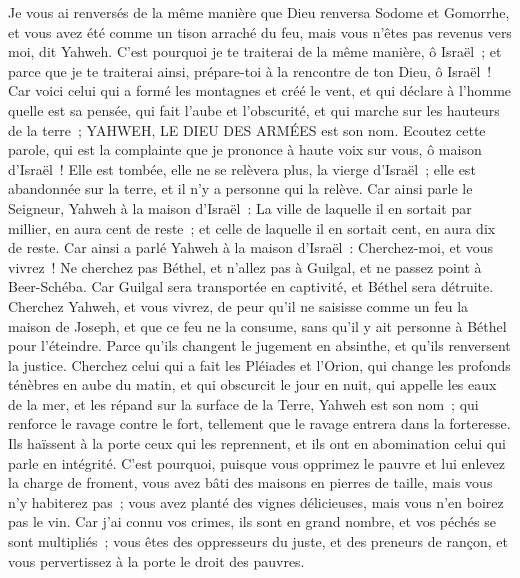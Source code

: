 \begin{multicols}{2}
Je vous ai renversés de la même manière que Dieu renversa Sodome et Gomorrhe, et vous avez été comme un tison arraché du feu, mais vous n'êtes pas revenus vers moi, dit Yahweh.
C'est pourquoi je te traiterai de la même manière, ô Israël~; et parce que je te traiterai ainsi, prépare-toi à la rencontre de ton Dieu, ô Israël~!
Car voici celui qui a formé les montagnes et créé le vent, et qui déclare à l'homme quelle est sa pensée, qui fait l'aube et l'obscurité, et qui marche sur les hauteurs de la terre~; YAHWEH, LE DIEU DES ARMÉES est son nom.
\VerseOne{}Ecoutez cette parole, qui est la complainte que je prononce à haute voix sur vous, ô maison d'Israël~!
Elle est tombée, elle ne se relèvera plus, la vierge d'Israël~; elle est abandonnée sur la terre, et il n'y a personne qui la relève.
Car ainsi parle le Seigneur, Yahweh à la maison d'Israël~: La ville de laquelle il en sortait par millier, en aura cent de reste~; et celle de laquelle il en sortait cent, en aura dix de reste.
Car ainsi a parlé Yahweh à la maison d'Israël~: Cherchez-moi, et vous vivrez~!
Ne cherchez pas Béthel, et n'allez pas à Guilgal, et ne passez point à Beer-Schéba. Car Guilgal sera transportée en captivité, et Béthel sera détruite.
Cherchez Yahweh, et vous vivrez, de peur qu'il ne saisisse comme un feu la maison de Joseph, et que ce feu ne la consume, sans qu'il y ait personne à Béthel pour l'éteindre.
Parce qu'ils changent le jugement en absinthe, et qu'ils renversent la justice.
Cherchez celui qui a fait les Pléiades et l'Orion, qui change les profonds ténèbres en aube du matin, et qui obscurcit le jour en nuit, qui appelle les eaux de la mer, et les répand sur la surface de la Terre, Yahweh est son nom~;
qui renforce le ravage contre le fort, tellement que le ravage entrera dans la forteresse.
Ils haïssent à la porte ceux qui les reprennent, et ils ont en abomination celui qui parle en intégrité.
C'est pourquoi, puisque vous opprimez le pauvre et lui enlevez la charge de froment, vous avez bâti des maisons en pierres de taille, mais vous n'y habiterez pas~; vous avez planté des vignes délicieuses, mais vous n'en boirez pas le vin.
Car j'ai connu vos crimes, ils sont en grand nombre, et vos péchés se sont multipliés~; vous êtes des oppresseurs du juste, et des preneurs de rançon, et vous pervertissez à la porte le droit des pauvres.

\end{multicols}
